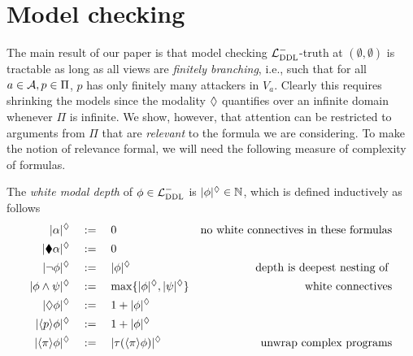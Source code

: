 \documentclass{llncs}
\newcommand{\dlangm}{{\mathcal L}_{\acro{DDL}}^{-}}
\newcommand{\carriers}[1]{Q_{#1}}
\newcommand{\state}{state }
\newcommand{\views}{\mathcal B}
\newcommand{\sem}{\varepsilon}
\newcommand{\depth}[1]{|{#1}|^\adia}
\begin{document}
\section{Model checking}\label{sec:mcheck}
The main result of our paper is that model checking $\dlangm$-truth at $(\emptyset,\emptyset)$ is tractable as long as all views are \emph{finitely branching}, i.e., such that for all $a \in \mathcal A, p \in \Pi$, $p$ has only finitely many attackers in $V_a$. Clearly this requires shrinking the models since the modality $\lozenge$ quantifies over an infinite domain whenever $\Pi$ is infinite. We show, however, that attention can be restricted to arguments from $\Pi$ that are \emph{relevant} to the formula we are considering. To make the notion of relevance formal, we will need the following measure of complexity of formulas.
%

\begin{definition}\label{def:depth} The \emph{white modal depth} of $\phi \in \dlangm$ is $\depth{\phi} \in \mathbb N$, which is defined inductively as follows 
\begin{align*}
\depth{\alpha} \quad & := \quad 0 & \text{no white connectives in these formulas}\\
\depth{\cdia \alpha} \quad & := \quad 0 \\
\depth{\neg \phi} \quad &:= \quad \depth{\phi} & \text{depth is deepest nesting of }\\
\depth{\phi \wedge \psi} \quad &:= \quad \max\{\depth{\phi}, \depth{\psi}\} & \text{white connectives}\\
\depth{\adia \phi} \quad &:= \quad 1 + \depth{\phi} \\
\depth{\ddia p \phi} \quad &:= \quad 1 + \depth{\phi} \\
\depth{\ddia \pi \phi} \quad &:= \quad \depth{\tau(\ddia \pi \phi)} & \text{unwrap complex programs}\\
\end{align*}
\end{definition}
\end{document}
